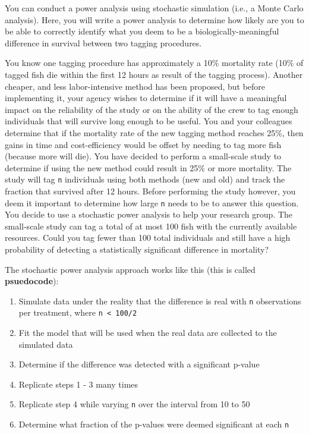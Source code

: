 \documentclass[]{book}
\providecommand{\tightlist}{%
  \setlength{\itemsep}{0pt}\setlength{\parskip}{0pt}}
\theoremstyle{definition}
\theoremstyle{definition}
\theoremstyle{definition}
\theoremstyle{remark}
\begin{document}
You can conduct a power analysis using stochastic simulation (i.e., a
Monte Carlo analysis). Here, you will write a power analysis to
determine how likely are you to be able to correctly identify what you
deem to be a biologically-meaningful difference in survival between two
tagging procedures.

You know one tagging procedure has approximately a 10\% mortality rate
(10\% of tagged fish die within the first 12 hours as result of the
tagging process). Another cheaper, and less labor-intensive method has
been proposed, but before implementing it, your agency wishes to
determine if it will have a meaningful impact on the reliability of the
study or on the ability of the crew to tag enough individuals that will
survive long enough to be useful. You and your colleagues determine that
if the mortality rate of the new tagging method reaches 25\%, then gains
in time and cost-efficiency would be offset by needing to tag more fish
(because more will die). You have decided to perform a small-scale study
to determine if using the new method could result in 25\% or more
mortality. The study will tag \texttt{n} individuals using both methods
(new and old) and track the fraction that survived after 12 hours.
Before performing the study however, you deem it important to determine
how large \texttt{n} needs to be to answer this question. You decide to
use a stochastic power analysis to help your research group. The
small-scale study can tag a total of at most 100 fish with the currently
available resources. Could you tag fewer than 100 total individuals and
still have a high probability of detecting a statistically significant
difference in mortality?

The stochastic power analysis approach works like this (this is called
\textbf{psuedocode}):

\begin{enumerate}
\def\labelenumi{\arabic{enumi}.}
\tightlist
\item
  Simulate data under the reality that the difference is real with
  \texttt{n} observations per treatment, where
  \texttt{n\ \textless{}\ 100/2}
\item
  Fit the model that will be used when the real data are collected to
  the simulated data
\item
  Determine if the difference was detected with a significant p-value
\item
  Replicate steps 1 - 3 many times
\item
  Replicate step 4 while varying \texttt{n} over the interval from 10 to
  50
\item
  Determine what fraction of the p-values were deemed significant at
  each \texttt{n}
\end{enumerate}
\end{document}

